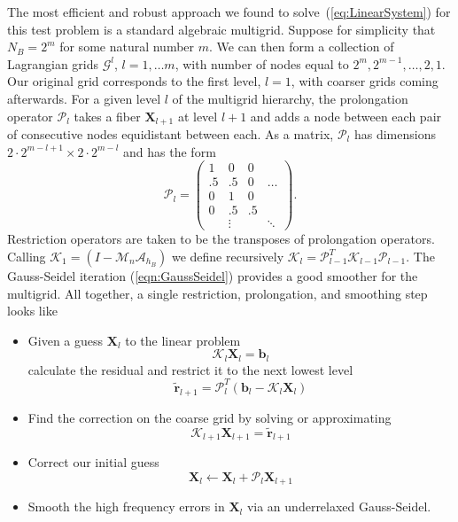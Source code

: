 \documentclass[preprint,12pt]{elsarticle}
\begin{document}
The most efficient and robust approach we found to solve~(\ref{eq:LinearSystem}) for this test problem
is a standard algebraic multigrid. Suppose for simplicity that $N_B=2^m$ for some natural number $m$. We can then form a collection of Lagrangian grids $\mathcal{G}^l$, $l=1, \ldots m$, with number of nodes equal to $2^m,2^{m-1},  \ldots, 2,1$.
Our original grid corresponds to the first level, $l=1$, with coarser grids coming afterwards.
For a given level $l$  of the multigrid hierarchy,  the prolongation operator $\mathcal{P}_l$ takes a fiber $\mathbf{X}_{l+1}$ at level $l+1$ and adds a node between each pair of consecutive nodes equidistant between each. As a matrix,  $\mathcal{P}_l$ has dimensions $2\cdot 2^{m-l+1}\times 2\cdot 2^{m-l}$ and has the form
\begin{equation}
\mathcal{P}_l = 
\left( \begin{array}{cccc}
1  & 0  & 0  &  \\
.5 & .5 & 0  & \dots \\
0  & 1  & 0  & \\
0  & .5 & .5 & \\
   &\vdots& & \ddots
\end{array} \right).
\end{equation}
Restriction operators are taken to be the transposes of prolongation operators. Calling $\mathcal{K}_1 = (\mathit{I}- \mathcal{M}_n\mathcal{A}_{h_B})$ we define recursively $\mathcal{K}_l = \mathcal{P}_{l-1}^{\mathit{T}} \mathcal{K}_{l-1} \mathcal{P}_{l-1}$. The Gauss-Seidel iteration (\ref{eqn:GaussSeidel}) provides a good smoother for the multigrid.
All together,  a single restriction, prolongation, and smoothing step looks like
\begin{itemize}
\item Given a guess $\mathbf{X}_l$ to the linear problem
\begin{equation}
\mathcal{K}_l\mathbf{X}_l = \mathbf{b}_l 
\end{equation}
calculate the residual and restrict it to the next lowest level
\begin{equation}
\tilde{\mathbf{r}}_{l+1} = \mathcal{P}_l^T(\mathbf{b}_l - \mathcal{K}_l\mathbf{X}_l)
\end{equation}
\item Find the correction on the coarse grid by solving or approximating
\begin{equation}
\mathcal{K}_{l+1}\mathbf{X}_{l+1} = \tilde{\mathbf{r}}_{l+1}
\end{equation}
\item Correct our initial guess
\begin{equation}
\mathbf{X}_l \leftarrow \mathbf{X}_l + \mathcal{P}_l \mathbf{X}_{l+1}
\end{equation}
\item Smooth the high frequency errors in $\mathbf{X}_l$ via an underrelaxed Gauss-Seidel.
\end{itemize}
\end{document}

